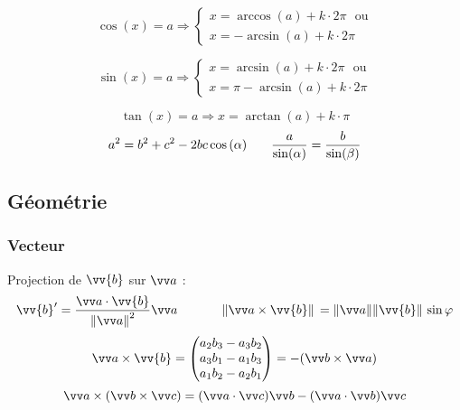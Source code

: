 \documentclass[../main.tex]{subfiles}
\begin{document}
\[
  \cos(x)=a \Rightarrow
  \begin{cases}
    x = \arccos(a) + k\cdot 2\pi \,\,\,\,\text{ou}\\
    x = - \arcsin(a) + k\cdot 2\pi 
  \end{cases}
\]

\[
  \sin(x)=a \Rightarrow
  \begin{cases}
    x = \arcsin(a) + k\cdot 2\pi \,\,\,\,\text{ou}\\
    x = \pi - \arcsin(a) + k\cdot 2\pi 
  \end{cases}
\]

\[\tan(x)= a \Rightarrow x = \arctan(a) + k\cdot\pi\]
\[
  a^2 = b^2 + c^2 - 2bc\cos\left(\alpha\right)\phantom{text} \frac{a}{\sin(\alpha)}=\frac{b}{\sin(\beta)} 
\]


\renewcommand{\arraystretch}{1}

\subsection{Géométrie}
\subsubsection{Vecteur}

Projection de \(\vv{b}\) sur \(\ac\) : 
\[
  \vv{b}' = \frac{\ac\cdot\vv{b}}{\norm{\ac}^2}\ac \phantom{texttext} 
  \norm*{\ac\times\vv{b}}=\norm{\ac}\norm*{\vv{b}}\sin\varphi
\]
\[
  \ac\times\vv{b}=\begin{pmatrix}
    a_2b_3 - a_3b_2 \\ 
    a_3b_1 - a_1b_3 \\ 
    a_1b_2 - a_2b_1
  \end{pmatrix}
  =-(\vecb\times\veca)
\]
\[
  \veca\times(\vecb\times\vecc)=(\veca\cdot\vecc)\vecb - (\veca\cdot\vecb)\vecc
\]
\end{document}
